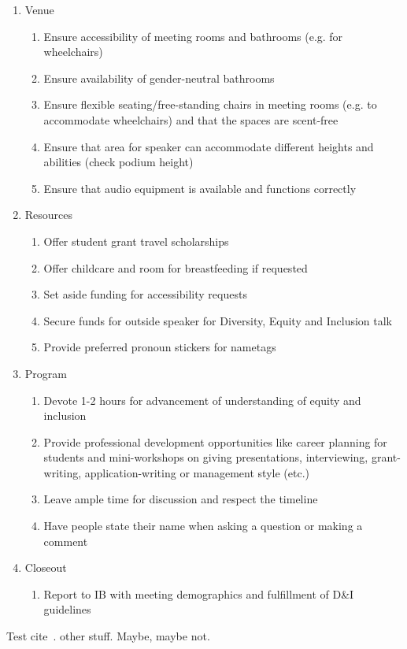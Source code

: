 \documentclass{article}
\begin{document}
\begin{enumerate}
\begin{enumerate}[label=\alph*.]
    \end{enumerate}
    \item Venue
    \begin{enumerate}[label=\alph*.]
      \item Ensure accessibility of meeting rooms and bathrooms (e.g. for wheelchairs)
      \item Ensure availability of gender-neutral bathrooms
      \item Ensure flexible seating/free-standing chairs in meeting rooms (e.g. to accommodate wheelchairs) and that the spaces are scent-free
      \item Ensure that area for speaker can accommodate different heights and abilities (check podium height)
      \item Ensure that audio equipment is available and functions correctly
    \end{enumerate}
    \item Resources
    \begin{enumerate}[label=\alph*.]
      \item Offer student grant travel scholarships
      \item Offer childcare and room for breastfeeding if requested
      \item Set aside funding for accessibility requests
      \item Secure funds for outside speaker for Diversity, Equity and Inclusion talk
      \item Provide preferred pronoun stickers for nametags
    \end{enumerate}
    \item Program
    \begin{enumerate}[label=\alph*.]
      \item Devote 1-2 hours for advancement of understanding of equity and inclusion
      \item Provide professional development opportunities like career planning for students and mini-workshops on giving presentations, interviewing, grant-writing, application-writing or management style (etc.)
      \item Leave ample time for discussion and respect the timeline
      \item Have people state their name when asking a question or making a comment
    \end{enumerate}
    \item Closeout
    \begin{enumerate}[label=\alph*.]
      \item Report to IB with meeting demographics and fulfillment of D&I guidelines
    \end{enumerate}
  \end{enumerate}

  Test cite~\cite{AudioAccessibility, TheAtlantic, DCMP, ReelWords, A11yNYC, Wired, AngryDeafPeople}.
  other stuff. Maybe, maybe not.
  \printbibliography
\end{document}
